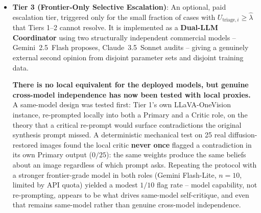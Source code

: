 \documentclass[12pt,a4paper]{report}
\begin{document}
\begin{itemize}
    \item \textbf{Tier 3 (Frontier-Only Selective Escalation)}: An optional, paid escalation tier, triggered only for the small fraction of cases with $U_{\text{triage},i} \ge \hat\lambda$ that Tiers 1--2 cannot resolve. It is implemented as a \textbf{Dual-LLM Coordinator} using two structurally independent commercial models -- Gemini~2.5~Flash proposes, Claude~3.5~Sonnet audits -- giving a genuinely external second opinion from disjoint parameter sets and disjoint training data.

    \textbf{There is no local equivalent for the deployed models, but genuine cross-model independence has now been tested with local proxies.} A same-model design was tested first: Tier 1's own LLaVA-OneVision instance, re-prompted locally into both a Primary and a Critic role, on the theory that a critical re-prompt would surface contradictions the original synthesis prompt missed. A deterministic mechanical test on 25 real diffusion-restored images found the local critic \textbf{never once} flagged a contradiction in its own Primary output ($0/25$): the same weights produce the same beliefs about an image regardless of which prompt asks. Repeating the protocol with a stronger frontier-grade model in both roles (Gemini Flash-Lite, $n=10$, limited by API quota) yielded a modest $1/10$ flag rate -- model capability, not re-prompting, appears to be what drives same-model self-critique, and even that remains same-model rather than genuine cross-model independence.


\end{itemize}
\end{document}
